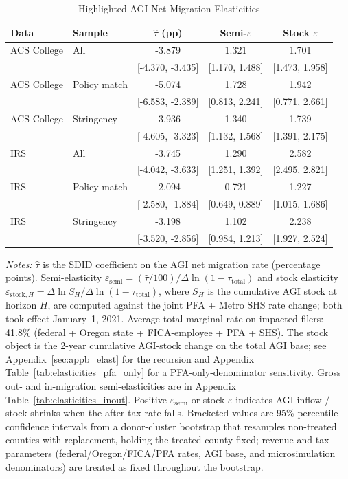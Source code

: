 \begin{table}[htbp]
\centering
\begin{threeparttable}
\caption{Highlighted AGI Net-Migration Elasticities}
\label{tab:elasticities}
\begin{tabular}{ll ccc}
\toprule
Data & Sample & $\hat{\tau}$ (pp) & Semi-$\varepsilon$ & Stock $\varepsilon$ \\
\midrule
ACS College & All & -3.879 & 1.321 & 1.701 \\
 & & [-4.370, -3.435] & [1.170, 1.488] & [1.473, 1.958] \\
ACS College & Policy match & -5.074 & 1.728 & 1.942 \\
 & & [-6.583, -2.389] & [0.813, 2.241] & [0.771, 2.661] \\
ACS College & Stringency & -3.936 & 1.340 & 1.739 \\
 & & [-4.605, -3.323] & [1.132, 1.568] & [1.391, 2.175] \\
\addlinespace
IRS & All & -3.745 & 1.290 & 2.582 \\
 & & [-4.042, -3.633] & [1.251, 1.392] & [2.495, 2.821] \\
IRS & Policy match & -2.094 & 0.721 & 1.227 \\
 & & [-2.580, -1.884] & [0.649, 0.889] & [1.015, 1.686] \\
IRS & Stringency & -3.198 & 1.102 & 2.238 \\
 & & [-3.520, -2.856] & [0.984, 1.213] & [1.927, 2.524] \\
\bottomrule
\end{tabular}
\begin{tablenotes}
\small
\item \textit{Notes:} 
$\hat{\tau}$ is the SDID coefficient on the AGI net migration rate (percentage points). 
Semi-elasticity $\varepsilon_{\text{semi}} = (\hat{\tau}/100)/\Delta\ln(1-\tau_\text{total})$ and stock elasticity $\varepsilon_{\text{stock},H} = \Delta\ln S_H / \Delta\ln(1-\tau_\text{total})$, where $S_H$ is the cumulative AGI stock at horizon $H$, are computed against the joint PFA + Metro SHS rate change; both took effect January~1, 2021. 
Average total marginal rate on impacted filers: 41.8\% (federal + Oregon state + FICA-employee + PFA + SHS). 
The stock object is the 2-year cumulative AGI-stock change on the total AGI base; see Appendix~\ref{sec:appb_elast} for the recursion and Appendix Table~\ref{tab:elasticities_pfa_only} for a PFA-only-denominator sensitivity. 
Gross out- and in-migration semi-elasticities are in Appendix Table~\ref{tab:elasticities_inout}. 
Positive $\varepsilon_{\text{semi}}$ or stock $\varepsilon$ indicates AGI inflow / stock shrinks when the after-tax rate falls. 
Bracketed values are 95\% percentile confidence intervals from a 
donor-cluster bootstrap that resamples non-treated counties with replacement, 
holding the treated county fixed; revenue and tax parameters 
(federal/Oregon/FICA/PFA rates, AGI base, and microsimulation denominators) 
are treated as fixed throughout the bootstrap.
\end{tablenotes}
\end{threeparttable}
\end{table}
